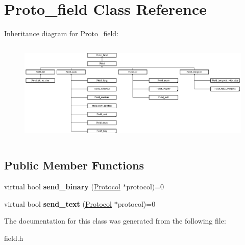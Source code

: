 \hypertarget{classProto__field}{}\section{Proto\+\_\+field Class Reference}
\label{classProto__field}
Inheritance diagram for Proto\+\_\+field\+:\begin{figure}[H]
\begin{center}
\leavevmode
\includegraphics[height=4.907976cm]{classProto__field}
\end{center}
\end{figure}
\subsection*{Public Member Functions}
\begin{DoxyCompactItemize}
\item 
\mbox{\label{classProto__field_a41ddfda50b82290271e929ab87679d52}} 
virtual bool {\bfseries send\+\_\+binary} (\mbox{\hyperlink{classProtocol}{Protocol}} $\ast$protocol)=0
\item 
\mbox{\label{classProto__field_a1bebb941daf1656d80e419a5a84aec7b}} 
virtual bool {\bfseries send\+\_\+text} (\mbox{\hyperlink{classProtocol}{Protocol}} $\ast$protocol)=0
\end{DoxyCompactItemize}


The documentation for this class was generated from the following file\+:\begin{DoxyCompactItemize}
\item 
field.\+h\end{DoxyCompactItemize}
